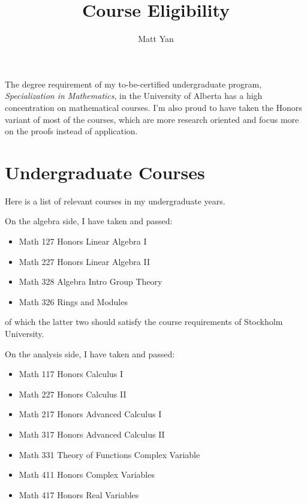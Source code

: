 \documentclass[11pt]{article}
\title{Course Eligibility}
\author{Matt Yan}
\begin{document}
    \maketitle



    The degree requirement of my to-be-certified undergraduate program, \textit{Specialization in Mathematics},
    in the University of Alberta has a high concentration on mathematical courses.
    I'm also proud to have taken the Honors variant of most of the courses,
    which are more research oriented and focus more on the proofs instead of application.

    \section*{Undergraduate Courses}

    Here is a list of relevant courses in my undergraduate years.

    On the algebra side, I have taken and passed:

    \begin{itemize}
        \item Math 127 Honors Linear Algebra I
        \item Math 227 Honors Linear Algebra II
        \item Math 328 Algebra Intro Group Theory
        \item Math 326 Rings and Modules
    \end{itemize}

    of which the latter two should satisfy the course requirements of Stockholm University.

    On the analysis side, I have taken and passed:

    \begin{itemize}
        \item Math 117 Honors Calculus I
        \item Math 227 Honors Calculus II
        \item Math 217 Honors Advanced Calculus I
        \item Math 317 Honors Advanced Calculus II
        \item Math 331 Theory of Functions Complex Variable
        \item Math 411 Honors Complex Variables
        \item Math 417 Honors Real Variables
    \end{itemize}
\end{document}
